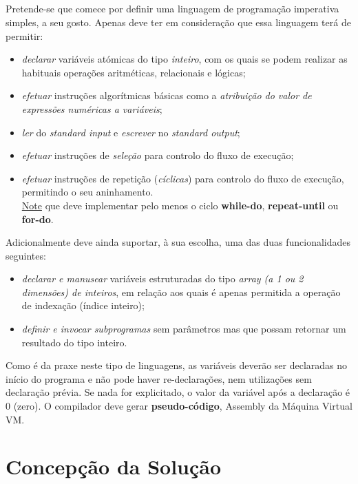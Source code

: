 \documentclass[11pt,a4paper]{report}
\begin{document}
    \paragraph{}
    Pretende-se que comece por definir uma linguagem de programação imperativa simples, a seu gosto.
    Apenas deve ter em consideração que essa linguagem terá de permitir:
    \begin{itemize}
        \item \textit{declarar} variáveis atómicas do tipo \textit{inteiro}, com os quais se podem realizar as habituais operações aritméticas, relacionais e lógicas;
        \item \textit{efetuar} instruções algorítmicas básicas como a \textit{atribuição do valor de expressões numéricas a variáveis};
        \item \textit{ler} do \textit{standard input} e \textit{escrever} no \textit{standard output};
        \item \textit{efetuar} instruções de \textit{seleção} para controlo do fluxo de execução;
        \item \textit{efetuar} instruções de repetição (\textit{cíclicas}) para controlo do fluxo de execução, permitindo o seu aninhamento.\\
    \underline{Note} que deve implementar pelo menos o ciclo \textbf{while-do}, \textbf{repeat-until} ou \textbf{for-do}.
    \end{itemize}

    Adicionalmente deve ainda suportar, à sua escolha, uma das duas funcionalidades seguintes:
    \begin{itemize}
        \item \textit{declarar e manusear} variáveis estruturadas do tipo \textit{array (a 1 ou 2 dimensões) de inteiros}, em relação aos quais é apenas permitida a operação de indexação (índice inteiro);
        \item \textit{definir e invocar subprogramas} sem parâmetros mas que possam retornar um resultado do tipo inteiro.
    \end{itemize}

    Como é da praxe neste tipo de linguagens, as variáveis deverão ser declaradas no início do programa e não pode haver re-declarações, nem utilizações sem declaração prévia. Se nada for explicitado, o valor da variável após a declaração é 0 (zero).
    O compilador deve gerar \textbf{pseudo-código}, Assembly da Máquina Virtual VM.


    \chapter{Concepção da Solução}
\end{document}
